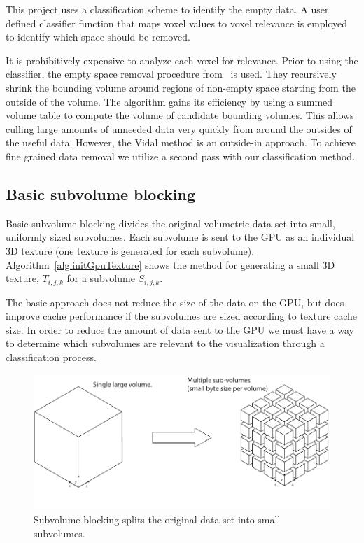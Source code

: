 \documentclass[journal]{vgtc}                %
\begin{document}
This project uses a classification scheme to identify the empty data. A user defined
classifier function that maps voxel values to voxel relevance is employed to identify
which space should be removed. 

It is prohibitively expensive to analyze each voxel for relevance. Prior to using the classifier,
the empty space removal procedure from~\cite{Vidal2008-dx} is used. 
They recursively shrink the bounding volume around regions of non-empty space
starting from the outside of the volume. The algorithm gains its efficiency by
using a summed volume table to compute the volume of candidate bounding
volumes. This allows culling large amounts of unneeded data very quickly from around 
the outsides of the useful data. However, the Vidal method is an outside-in approach. To
achieve fine grained data removal we utilize a second pass with our classification method.

\subsection{Basic subvolume blocking}\label{sec:basicSubvolumeBlocking}

Basic subvolume blocking divides the original volumetric data set into small,
uniformly sized subvolumes. Each subvolume is sent to the GPU
as an individual 3D texture (one texture is generated for each subvolume). 
Algorithm~\ref{alg:initGpuTexture}
shows the method for generating a small 3D texture, $T_{i,j,k}$ for a subvolume
$S_{i,j,k}$.

The basic approach does not reduce the size of the data on the GPU, but does
improve cache performance if the subvolumes are sized according to texture
cache size. In order to reduce the amount of data sent to the GPU we must have 
a way to determine which subvolumes are relevant to the visualization through
a classification process.


\begin{figure}[htb]\label{fig:volumeToSubvolumes}
	\begin{centering}
		\includegraphics[width=\linewidth,height=0.3\textheight,keepaspectratio]{volume_to_subvolumes}
		\caption{Subvolume blocking splits the original data set into small subvolumes.}
	\end{centering}
\end{figure}
\end{document}
